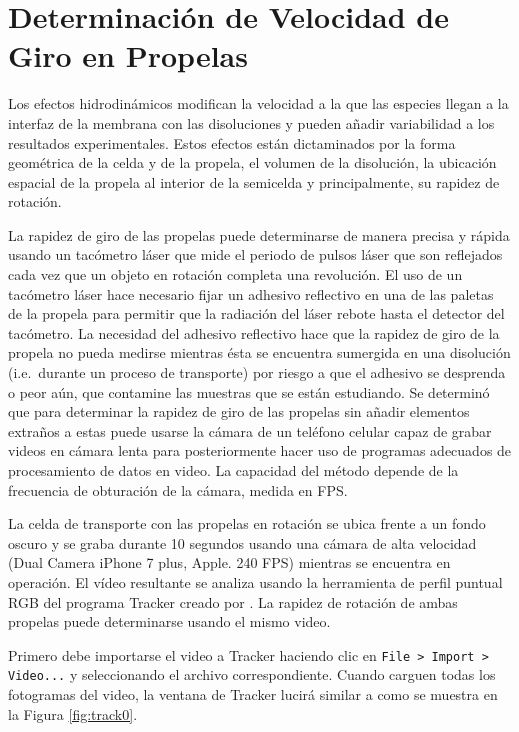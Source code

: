 \chapter{Determinación de Velocidad de Giro en Propelas}\label{App:tracker}
\vspace{-1cm} Los efectos hidrodinámicos modifican la velocidad a la que las especies llegan a la interfaz de la membrana con las disoluciones y pueden añadir variabilidad a los resultados experimentales. Estos efectos están dictaminados por la forma geométrica de la celda y de la propela, el volumen de la disolución, la ubicación espacial de la propela al interior de la semicelda y principalmente, su rapidez de rotación.

La rapidez de giro de las propelas puede determinarse de manera precisa y rápida usando un tacómetro láser que mide el periodo de pulsos láser que son reflejados cada vez que un objeto en rotación completa una revolución. El uso de un tacómetro láser hace necesario fijar un adhesivo reflectivo en una de las paletas de la propela para permitir que la radiación del láser rebote hasta el detector del tacómetro. La necesidad del adhesivo reflectivo hace que la rapidez de giro de la propela no pueda medirse mientras ésta se encuentra sumergida en una disolución (i.e.\ durante un proceso de transporte) por riesgo a que el adhesivo se desprenda o peor aún, que contamine las muestras que se están estudiando. Se determinó que para determinar la rapidez de giro de las propelas sin añadir elementos extraños a estas puede usarse la cámara de un teléfono celular capaz de grabar videos en cámara lenta para posteriormente hacer uso de programas adecuados de procesamiento de datos en video. La capacidad del método depende de la frecuencia de obturación de la cámara, medida en \ac{FPS}.

La celda de transporte con las propelas en rotación se ubica frente a un fondo oscuro y se graba durante 10 segundos usando una cámara de alta velocidad (Dual Camera iPhone 7 plus, Apple. 240 \ac{FPS}) mientras se encuentra en operación. El vídeo resultante se analiza usando la herramienta de perfil puntual \ac{RGB} del programa Tracker creado por \citet{tracker}. La rapidez de rotación de ambas propelas puede determinarse usando el mismo video. 

Primero debe importarse el video a Tracker haciendo clic en \colorbox{lgray}{\texttt{File > Import > Video...}} y seleccionando el archivo correspondiente. Cuando carguen todas los fotogramas del video, la ventana de Tracker lucirá similar a como se muestra en la Figura \ref{fig:track0}.

